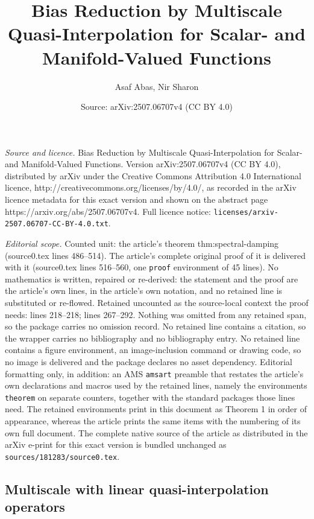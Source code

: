 \documentclass[10pt,a4paper]{amsart}
\title{Bias Reduction by Multiscale Quasi-Interpolation for Scalar- and Manifold-Valued Functions}
\author{Asaf Abas, Nir Sharon}
\date{Source: arXiv:2507.06707v4 (CC BY 4.0)}
\begin{document}
\maketitle

\noindent\emph{Source and licence.} Bias Reduction by Multiscale Quasi-Interpolation for Scalar- and Manifold-Valued Functions. Version arXiv:2507.06707v4 (CC BY 4.0), distributed by arXiv under the Creative Commons Attribution 4.0 International licence, http://creativecommons.org/licenses/by/4.0/, as recorded in the arXiv licence metadata for this exact version and shown on the abstract page https://arxiv.org/abs/2507.06707v4. Full licence notice: \texttt{licenses/arxiv-2507.06707-CC-BY-4.0.txt}.\par\smallskip

\noindent\textit{Editorial scope.} Counted unit: the article's theorem thm:spectral-damping (source0.tex lines 486--514). The article's complete original proof of it is delivered with it (source0.tex lines 516--560, one \texttt{proof} environment of 45 lines). No mathematics is written, repaired or re-derived: the statement and the proof are the article's own lines, in the article's own notation, and no retained line is substituted or re-flowed.  Retained uncounted as the source-local context the proof needs: lines 218--218; lines 267--292.  Nothing was omitted from any retained span, so the package carries no omission record.  No retained line contains a citation, so the wrapper carries no bibliography and no bibliography entry.  No retained line contains a figure environment, an image-inclusion command or drawing code, so no image is delivered and the package declares no asset dependency.  Editorial formatting only, in addition: an AMS \texttt{amsart} preamble that restates the article's own declarations and macros used by the retained lines, namely the environments \texttt{theorem} on separate counters, together with the standard packages those lines need.  The retained environments print in this document as Theorem 1 in order of appearance, whereas the article prints the same items with the numbering of its own full document.  The complete native source of the article as distributed in the arXiv e-print for this exact version is bundled unchanged as \texttt{sources/181283/source0.tex}.
\subsection{Multiscale with linear quasi-interpolation operators}\label{sec:linear}
\end{document}
